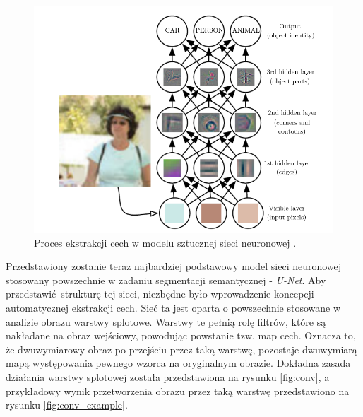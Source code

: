 \documentclass{classrep}
\begin{document}
{        \begin{figure}[!htbp]
        \centering
        \includegraphics[width=\textwidth]{img/feature_extraction.png}
        \caption{Proces ekstrakcji cech w modelu sztucznej sieci neuronowej \cite{url:feature_extraction}.}
        \label{fig:feature_extraction}
        \end{figure}
        \FloatBarrier

        Przedstawiony zostanie teraz najbardziej podstawowy model sieci neuronowej stosowany powszechnie w
        zadaniu segmentacji semantycznej - \emph{U-Net}. Aby przedstawić strukturę tej sieci, niezbędne było
        wprowadzenie koncepcji automatycznej ekstrakcji cech. Sieć ta jest oparta o powszechnie stosowane w
        analizie obrazu warstwy splotowe. Warstwy te pełnią rolę filtrów, które są nakładane na obraz
        wejściowy, powodując powstanie tzw. map cech. Oznacza to, że dwuwymiarowy obraz po przejściu przez
        taką warstwę, pozostaje dwuwymiarą mapą występowania pewnego wzorca na oryginalnym obrazie. Dokładna
        zasada działania warstwy splotowej została przedstawiona na rysunku \ref{fig:conv}, a przykładowy
        wynik przetworzenia obrazu przez taką warstwę przedstawiono na rysunku \ref{fig:conv_example}.

}
\end{document}
